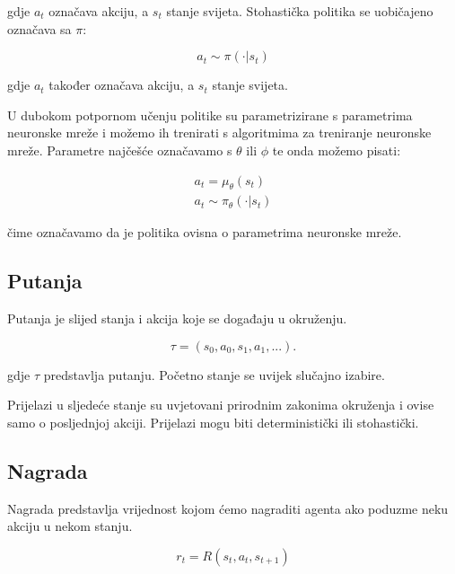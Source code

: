 \documentclass[times,utf8,diplomski]{fer}
\begin{document}
\noindent gdje ${a_t}$ označava akciju, a ${s_t}$ stanje svijeta. Stohastička politika se uobičajeno označava sa ${\pi}$:

\begin{equation}
	\label{stochastic policy}
	a_t \sim \pi(\cdot | s_t)
\end{equation}

\noindent gdje ${a_t}$ također označava akciju, a ${s_t}$ stanje svijeta.

U dubokom potpornom učenju politike su parametrizirane s parametrima neuronske mreže i možemo ih trenirati s algoritmima za treniranje neuronske mreže. Parametre najčešće označavamo s ${\theta}$ ili ${\phi}$ te onda možemo pisati:

\begin{equation}
	\label{neural network policy}
	\begin{aligned}
		a_t = \mu_{\theta}(s_t) \\
		a_t \sim \pi_{\theta}(\cdot | s_t)
	\end{aligned}
\end{equation}

\noindent čime označavamo da je politika ovisna o parametrima neuronske mreže.

\subsection{Putanja}

Putanja je slijed stanja i akcija koje se događaju u okruženju.

\begin{equation}
	\label{trajectory}
	\tau = (s_0, a_0, s_1, a_1, ...).
\end{equation}

\noindent gdje ${\tau}$ predstavlja putanju. Početno stanje se uvijek slučajno izabire.

Prijelazi u sljedeće stanje su uvjetovani prirodnim zakonima okruženja i ovise samo o posljednjoj akciji. Prijelazi mogu biti deterministički ili stohastički.


\subsection{Nagrada}

Nagrada predstavlja vrijednost kojom ćemo nagraditi agenta ako poduzme neku akciju u nekom stanju.


\begin{equation}
	\label{reward}
	r_t = R(s_t, a_t, s_{t+1})
\end{equation}
\end{document}
